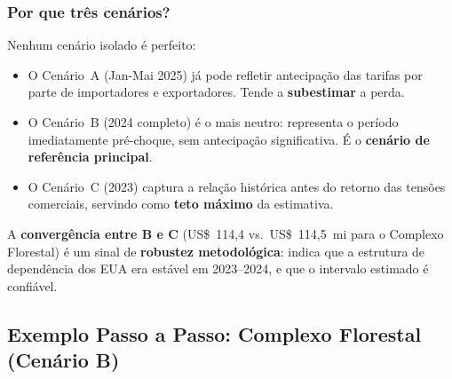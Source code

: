 \documentclass[12pt, a4paper]{article}
\begin{document}
\subsubsection*{Por que três cenários?}

Nenhum cenário isolado é perfeito:

\begin{itemize}
  \item O Cenário~A (Jan-Mai 2025) já pode refletir antecipação das tarifas
    por parte de importadores e exportadores. Tende a \textbf{subestimar} a perda.

  \item O Cenário~B (2024 completo) é o mais neutro: representa o período
    imediatamente pré-choque, sem antecipação significativa. É o
    \textbf{cenário de referência principal}.

  \item O Cenário~C (2023) captura a relação histórica antes do retorno
    das tensões comerciais, servindo como \textbf{teto máximo} da estimativa.
\end{itemize}

\noindent A \textbf{convergência entre B e C} (US\$~114,4 vs.\ US\$~114,5~mi
para o Complexo Florestal) é um sinal de \textbf{robustez metodológica}:
indica que a estrutura de dependência dos EUA era estável em 2023--2024,
e que o intervalo estimado é confiável.

\subsection{Exemplo Passo a Passo: Complexo Florestal (Cenário B)}
\end{document}
